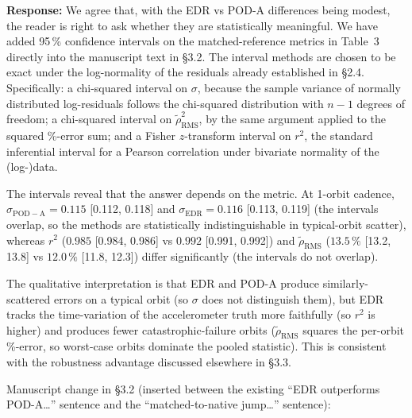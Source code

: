 \documentclass[11pt]{article}
\begin{document}
\textbf{Response:}
We agree that, with the EDR vs POD-A differences being modest, the reader is right to ask whether they are statistically meaningful. We have added 95\,\% confidence intervals on the matched-reference metrics in Table~3 directly into the manuscript text in \S3.2. The interval methods are chosen to be exact under the log-normality of the residuals already established in \S2.4. Specifically: a chi-squared interval on $\sigma$, because the sample variance of normally distributed log-residuals follows the chi-squared distribution with $n-1$ degrees of freedom; a chi-squared interval on $\tilde{\rho}_{\mathrm{RMS}}^{2}$, by the same argument applied to the squared \%-error sum; and a Fisher $z$-transform interval on $r^{2}$, the standard inferential interval for a Pearson correlation under bivariate normality of the (log-)data.

\medskip
\noindent The intervals reveal that the answer depends on the metric. At 1-orbit cadence, $\sigma_{\mathrm{POD-A}} = 0.115$ [0.112, 0.118] and $\sigma_{\mathrm{EDR}} = 0.116$ [0.113, 0.119] (the intervals overlap, so the methods are statistically indistinguishable in typical-orbit scatter), whereas $r^{2}$ ($0.985$ [0.984, 0.986] vs $0.992$ [0.991, 0.992]) and $\tilde{\rho}_{\mathrm{RMS}}$ ($13.5\,\%$ [13.2, 13.8] vs $12.0\,\%$ [11.8, 12.3]) differ significantly (the intervals do not overlap).

\medskip
\noindent The qualitative interpretation is that EDR and POD-A produce similarly-scattered errors on a typical orbit (so $\sigma$ does not distinguish them), but EDR tracks the time-variation of the accelerometer truth more faithfully (so $r^{2}$ is higher) and produces fewer catastrophic-failure orbits ($\tilde{\rho}_{\mathrm{RMS}}$ squares the per-orbit \%-error, so worst-case orbits dominate the pooled statistic). This is consistent with the robustness advantage discussed elsewhere in \S3.3.

\medskip
\noindent Manuscript change in \S3.2 (inserted between the existing ``EDR outperforms POD-A\ldots'' sentence and the ``matched-to-native jump\ldots'' sentence):
\end{document}
